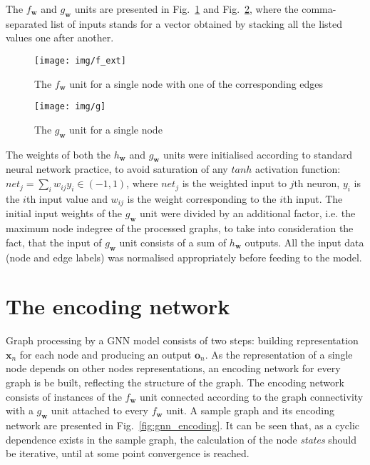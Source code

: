 The $f_{\bm{w}}$ and $g_{\bm{w}}$ units are presented in Fig.~\ref{fig:gnn_f} and Fig.~\ref{fig:gnn_g}, where the comma-separated list of inputs stands for a vector obtained by stacking all the listed values one after another.

\begin{figure}
\begin{center}
	\texttt{[image: img/f\_ext]}
	\caption{The $f_{\bm{w}}$ unit for a single node with one of the corresponding edges}
	\label{fig:gnn_f}
\end{center}
\end{figure}

\begin{figure}
\begin{center}
	\texttt{[image: img/g]}
	\caption{The $g_{\bm{w}}$ unit for a single node}
	\label{fig:gnn_g}
\end{center}
\end{figure}

The weights of both the $h_{\bm{w}}$ and $g_{\bm{w}}$ units were initialised according to standard neural network practice, to avoid saturation of any $tanh$ activation function: $net_j = \sum_i w_{ij} y_i \in (-1, 1)$, where $net_j$ is the weighted input to $j$th neuron, $y_i$ is the $i$th input value and $w_{ij}$ is the weight corresponding to the $i$th input. The initial input weights of the $g_{\bm{w}}$ unit were divided by an additional factor, i.e. the maximum node indegree of the processed graphs, to take into consideration the fact, that the input of $g_{\bm{w}}$ unit consists of a sum of $h_{\bm{w}}$ outputs. All the input data (node and edge labels) was normalised appropriately before feeding to the model.


\section{The encoding network}
Graph processing by a GNN model consists of two steps: building representation $\bm{x}_n$ for each node and producing an output $\bm{o}_n$. As the representation of a single node depends on other nodes representations, an encoding network for every graph is be built, reflecting the structure of the graph. The encoding network consists of instances of the $f_{\bm{w}}$ unit connected according to the graph connectivity with a $g_{\bm{w}}$ unit attached to every $f_{\bm{w}}$ unit. A sample graph and its encoding network are presented in Fig.~\ref{fig:gnn_encoding}.
It can be seen that, as a cyclic dependence exists in the sample graph, the calculation of the node \emph{states} should be iterative, until at some point convergence is reached.

